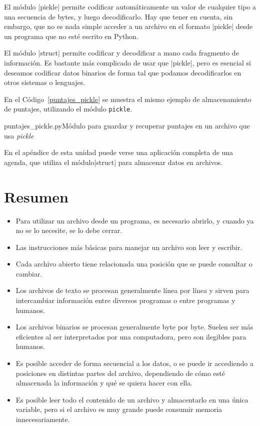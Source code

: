 El módulo |pickle| permite codificar automáticamente un valor de cualquier tipo
a una secuencia de bytes, y luego decodificarlo. Hay que tener en cuenta, sin
embargo, que no es nada simple acceder a un archivo en el formato |pickle|
desde un programa que no esté escrito en Python.

El módulo |struct| permite codificar y decodificar a mano cada fragmento de
información. Es bastante más complicado de usar que |pickle|, pero es esencial
si deseamos codificar datos binarios de forma tal que podamos decodificarlos en
otros sistemas o lenguajes.

En el Código~\ref{puntajes_pickle} se muestra el mismo ejemplo de
almacenamiento de puntajes, utilizando el módulo \lstinline!pickle!.

\begin{codigo}{puntajes\_pickle.py}{Módulo para guardar y recuperar puntajes en
    un archivo que usa \emph{pickle}}
\label{puntajes_pickle}

\end{codigo}

En el apéndice de esta unidad puede verse una aplicación completa de una
agenda, que utiliza el módulo|struct| para almacenar datos en archivos.

\section{Resumen}

\begin{itemize}
\item Para utilizar un archivo desde un programa, es necesario abrirlo, y
cuando ya no se lo necesite, se lo debe cerrar.
\item Las instrucciones más básicas para manejar un archivo son leer y escribir.
\item Cada archivo abierto tiene relacionada una posición que se puede
consultar o cambiar.
\item Los archivos de texto se procesan generalmente línea por línea y
sirven para intercambiar información entre diversos programas o entre
programas y humanos.
\item Los archivos binarios se procesan generalmente byte por byte. Suelen ser
más eficientes al ser interpretados por una computadora, pero son ilegibles
para humanos.
\item Es posible acceder de forma secuencial a los datos, o se puede ir
accediendo a posiciones en distintas partes del archivo, dependiendo de
cómo esté almacenada la información y qué se quiera hacer con ella.
\item Es posible leer todo el contenido de un archivo y almacentarlo en una
única variable, pero si el archivo es muy grande puede consumir memoria
innecesariamente.
\end{itemize}

